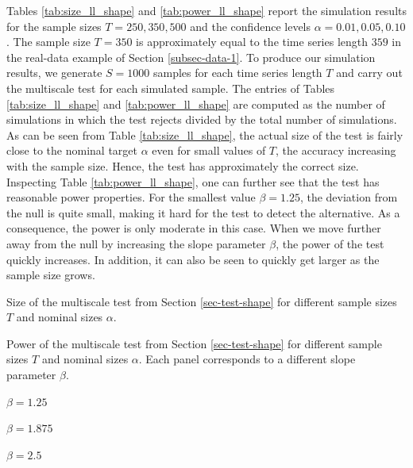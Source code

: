 Tables \ref{tab:size_ll_shape} and \ref{tab:power_ll_shape} report the simulation results for the sample sizes $T=250,350,500$ and the confidence levels $\alpha = 0.01, 0.05, 0.10$. The sample size $T = 350$ is approximately equal to the time series length $359$ in the real-data example of Section \ref{subsec-data-1}. To produce our simulation results, we generate $S=1000$ samples for each time series length $T$ and carry out the multiscale test for each simulated sample. The entries of Tables \ref{tab:size_ll_shape} and \ref{tab:power_ll_shape} are computed as the number of simulations in which the test rejects divided by the total number of simulations. As can be seen from Table \ref{tab:size_ll_shape}, the actual size of the test is fairly close to the nominal target $\alpha$ even for small values of $T$, the accuracy increasing with the sample size. Hence, the test has approximately the correct size. Inspecting Table \ref{tab:power_ll_shape}, one can further see that the test has reasonable power properties. For the smallest value $\beta = 1.25$, the deviation from the null is quite small, making it hard for the test to detect the alternative. As a consequence, the power is only moderate in this case. When we move further away from the null by increasing the slope parameter $\beta$, the power of the test quickly increases. In addition, it can also be seen to quickly get larger as the sample size grows. 
 

\begin{table}[t]
\footnotesize{
\centering
\caption{Size of the multiscale test from Section \ref{sec-test-shape} for different sample sizes $T$ and nominal sizes $\alpha$.}
\label{tab:size_ll_shape}
}
\end{table}

\begin{table}[t]
\footnotesize{
\begin{center}
\caption{Power of the multiscale test from Section \ref{sec-test-shape} for different sample sizes $T$ and nominal sizes $\alpha$. Each panel corresponds to a different slope parameter $\beta$.}\label{tab:power_ll_shape}
\begin{subtable}[b]{0.32\textwidth}
\centering
\caption{$\beta = 1.25$}\label{tab:power_050_ll_shape}

\end{subtable}
\begin{subtable}[b]{0.32\textwidth}
\centering
\caption{$\beta = 1.875$}\label{tab:power_075_ll_shape}

\end{subtable}
\begin{subtable}[b]{0.32\textwidth}
\centering
\caption{$\beta = 2.5$}\label{tab:power_100_ll_shape}

\end{subtable}
\end{center}}
\end{table}


